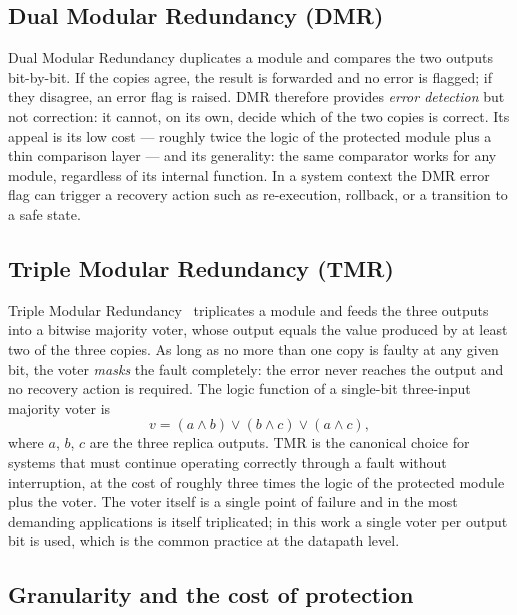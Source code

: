 \subsection{Dual Modular Redundancy (DMR)}

Dual Modular Redundancy duplicates a module and compares the two outputs
bit-by-bit. If the copies agree, the result is forwarded and no error is
flagged; if they disagree, an error flag is raised. DMR therefore provides
\emph{error detection} but not correction: it cannot, on its own, decide which of
the two copies is correct. Its appeal is its low cost --- roughly twice the logic
of the protected module plus a thin comparison layer --- and its generality: the
same comparator works for any module, regardless of its internal function. In a
system context the DMR error flag can trigger a recovery action such as
re-execution, rollback, or a transition to a safe state.

\subsection{Triple Modular Redundancy (TMR)}

Triple Modular Redundancy~\cite{vonneumann,koren} triplicates a module and feeds the three outputs into a
bitwise majority voter, whose output equals the value produced by at least two of
the three copies. As long as no more than one copy is faulty at any given bit,
the voter \emph{masks} the fault completely: the error never reaches the output
and no recovery action is required. The logic function of a single-bit
three-input majority voter is
\begin{equation}
  v = (a \wedge b) \vee (b \wedge c) \vee (a \wedge c),
  \label{eq:majority}
\end{equation}
where $a$, $b$, $c$ are the three replica outputs. TMR is the canonical choice
for systems that must continue operating correctly through a fault without
interruption, at the cost of roughly three times the logic of the protected
module plus the voter. The voter itself is a single point of failure and in the
most demanding applications is itself triplicated; in this work a single voter
per output bit is used, which is the common practice at the datapath level.

\subsection{Granularity and the cost of protection}


